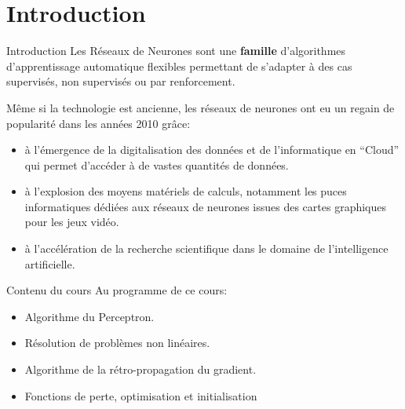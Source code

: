 \section[Introduction]{Introduction}

\begin{frame}{Introduction}
	Les Réseaux de Neurones sont une \textbf{famille} d'algorithmes d'apprentissage automatique flexibles permettant de s'adapter à des cas supervisés, non supervisés ou par renforcement.
	
	\vspace{0.3cm}
	
	Même si la technologie est ancienne, les réseaux de neurones ont eu un regain de popularité dans les années 2010 grâce:
	\begin{itemize}
		\item \`a l'émergence de la digitalisation des données et de l'informatique en ``Cloud'' qui permet d'accéder à de vastes quantités de données.
		\pause
		\item \`a l'explosion des moyens matériels de calculs, notamment les puces informatiques dédiées aux réseaux de neurones issues des cartes graphiques pour les jeux vidéo.
		\pause
		\item \`a l'accélération de la recherche scientifique dans le domaine de l'intelligence artificielle.
	\end{itemize}
	
\end{frame}
	
\begin{frame}{Contenu du cours}
	Au programme de ce cours:
	\begin{itemize}
		\pause
		\item Algorithme du Perceptron.
		\pause
		\item Résolution de problèmes non linéaires.
		\pause
		\item Algorithme de la rétro-propagation du gradient.
		\pause
		\item Fonctions de perte, optimisation et initialisation
	\end{itemize}
\end{frame}
